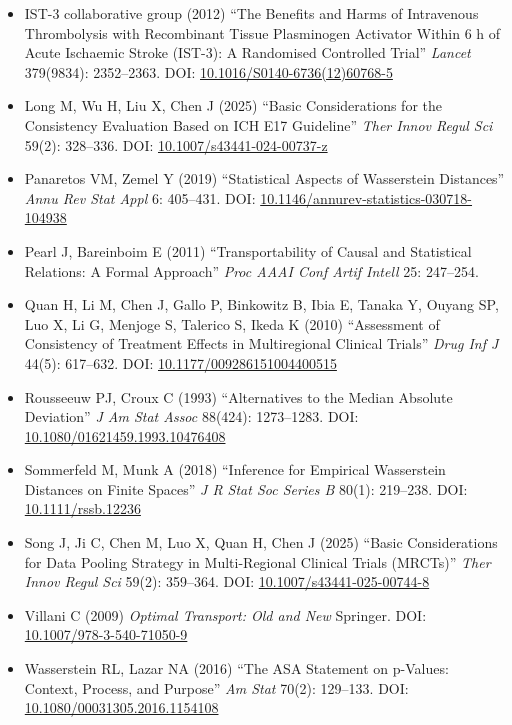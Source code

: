 \documentclass[
  a4paper,
  11pt]{ltjsarticle}
\begin{document}
\begin{itemize}
  and Design of Multi-Regional Clinical Trials (E17)'' International
  Council for Harmonisation, Geneva, Switzerland.
\item
  IST-3 collaborative group (2012) ``The Benefits and Harms of
  Intravenous Thrombolysis with Recombinant Tissue Plasminogen Activator
  Within 6 h of Acute Ischaemic Stroke (IST-3): A Randomised Controlled
  Trial'' \emph{Lancet} 379(9834): 2352--2363. DOI:
  \href{https://doi.org/10.1016/S0140-6736(12)60768-5}{10.1016/S0140-6736(12)60768-5}
\item
  Long M, Wu H, Liu X, Chen J (2025) ``Basic Considerations for the
  Consistency Evaluation Based on ICH E17 Guideline'' \emph{Ther Innov
  Regul Sci} 59(2): 328--336. DOI:
  \href{https://doi.org/10.1007/s43441-024-00737-z}{10.1007/s43441-024-00737-z}
\item
  Panaretos VM, Zemel Y (2019) ``Statistical Aspects of Wasserstein
  Distances'' \emph{Annu Rev Stat Appl} 6: 405--431. DOI:
  \href{https://doi.org/10.1146/annurev-statistics-030718-104938}{10.1146/annurev-statistics-030718-104938}
\item
  Pearl J, Bareinboim E (2011) ``Transportability of Causal and
  Statistical Relations: A Formal Approach'' \emph{Proc AAAI Conf Artif
  Intell} 25: 247--254.
\item
  Quan H, Li M, Chen J, Gallo P, Binkowitz B, Ibia E, Tanaka Y, Ouyang
  SP, Luo X, Li G, Menjoge S, Talerico S, Ikeda K (2010) ``Assessment of
  Consistency of Treatment Effects in Multiregional Clinical Trials''
  \emph{Drug Inf J} 44(5): 617--632. DOI:
  \href{https://doi.org/10.1177/009286151004400515}{10.1177/009286151004400515}
\item
  Rousseeuw PJ, Croux C (1993) ``Alternatives to the Median Absolute
  Deviation'' \emph{J Am Stat Assoc} 88(424): 1273--1283. DOI:
  \href{https://doi.org/10.1080/01621459.1993.10476408}{10.1080/01621459.1993.10476408}
\item
  Sommerfeld M, Munk A (2018) ``Inference for Empirical Wasserstein
  Distances on Finite Spaces'' \emph{J R Stat Soc Series B} 80(1):
  219--238. DOI:
  \href{https://doi.org/10.1111/rssb.12236}{10.1111/rssb.12236}
\item
  Song J, Ji C, Chen M, Luo X, Quan H, Chen J (2025) ``Basic
  Considerations for Data Pooling Strategy in Multi-Regional Clinical
  Trials (MRCTs)'' \emph{Ther Innov Regul Sci} 59(2): 359--364. DOI:
  \href{https://doi.org/10.1007/s43441-025-00744-8}{10.1007/s43441-025-00744-8}
\item
  Villani C (2009) \emph{Optimal Transport: Old and New} Springer. DOI:
  \href{https://doi.org/10.1007/978-3-540-71050-9}{10.1007/978-3-540-71050-9}
\item
  Wasserstein RL, Lazar NA (2016) ``The ASA Statement on p-Values:
  Context, Process, and Purpose'' \emph{Am Stat} 70(2): 129--133. DOI:
  \href{https://doi.org/10.1080/00031305.2016.1154108}{10.1080/00031305.2016.1154108}
\end{itemize}
\end{document}
